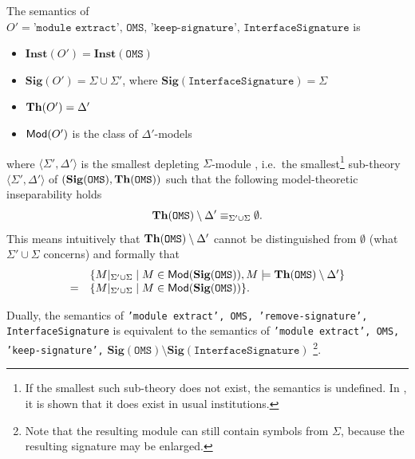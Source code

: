\documentclass[10pt,fleqn,%
\ifpretendfinal
final%
\else
draft%
\fi,
]{scrreprt}
\newcommand*{\syntax}[1]{\texttt{#1}}
\newcommand{\Sig}{\mathbf{Sig}}
\newcommand{\Inst}{\ensuremath{\mathbf{Inst}}}
\begin{document}
The semantics of $O' = \syntax{'module extract', OMS, 
'keep-signature', InterfaceSignature}$ is
\begin{itemize}
  \item $\Inst(O') = \Inst(\syntax{OMS})$
  \item $\Sig(O') = \Sigma \cup \Sigma'$, where
          $\Sig(\syntax{InterfaceSignature}) = \Sigma$
  \item $\mathbf{Th}(O') = \Delta'$
  \item $\mathsf{Mod}(O')$ is the class of $\Delta'$-models
\end{itemize}
where
$\langle\Sigma',\Delta'\rangle$ is the smallest depleting
$\Sigma$-module \cite{DBLP:journals/ai/KontchakovWZ10}, i.e.\ the
smallest\footnote{If the smallest such sub-theory does not exist, the
  semantics is undefined. In \cite{DBLP:journals/ai/KontchakovWZ10},
  it is shown that it does exist in usual institutions.}  sub-theory
$\langle\Sigma',\Delta'\rangle$ of $(\Sig(\syntax{OMS}), \Th(\syntax{OMS}))$  
such that the following model-theoretic inseparability
holds
  $$\Th(\syntax{OMS}) \setminus \Delta'  \equiv_{\Sigma' \cup \Sigma}  \emptyset.$$
This means intuitively that $\Th(\syntax{OMS}) \setminus \Delta'$
cannot be distinguished from $\emptyset$ (what $\Sigma'\cup \Sigma$ concerns) and formally that 
$$\begin{array}{ll}
&\{M\forget{\Sigma'\cup \Sigma} \mid M\in\Mod(\Sig(\syntax{OMS})), M  \models \Th(\syntax{OMS}) \setminus \Delta' \}\\
= &\{ M\forget{\Sigma'\cup \Sigma} \mid M\in\Mod(\Sig(\syntax{OMS})) \}.
\end{array}$$

\noindent
Dually, the semantics of 
\syntax{'module extract', OMS, 
'remove-signature', InterfaceSignature}
is equivalent to the semantics of
\syntax{'module extract', OMS, 
'keep-signature',} $\Sig(\syntax{OMS})\setminus 
\Sig(\syntax{InterfaceSignature})$ 
\footnote{Note that the resulting module
    can still contain symbols from $\Sigma$, because the resulting
    signature may be enlarged.}.

\end{document}

